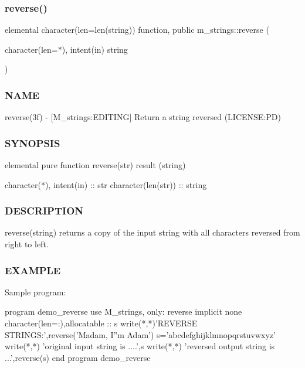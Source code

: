\subsubsection{\texorpdfstring{reverse()}{reverse()}}
{\footnotesize\ttfamily elemental character(len=len(string)) function, public m\+\_\+strings\+::reverse (\begin{DoxyParamCaption}\item[{character(len=$\ast$), intent(in)}]{string }\end{DoxyParamCaption})}



\subsubsection*{N\+A\+ME}

reverse(3f) -\/ \mbox{[}M\+\_\+strings\+:E\+D\+I\+T\+I\+NG\mbox{]} Return a string reversed (L\+I\+C\+E\+N\+SE\+:PD) 

\subsubsection*{S\+Y\+N\+O\+P\+S\+IS}

\begin{DoxyVerb}elemental pure function reverse(str) result (string)

 character(*), intent(in) :: str
 character(len(str))      :: string
\end{DoxyVerb}
 \subsubsection*{D\+E\+S\+C\+R\+I\+P\+T\+I\+ON}

reverse(string) returns a copy of the input string with all characters reversed from right to left.

\subsubsection*{E\+X\+A\+M\+P\+LE}

Sample program\+: \begin{DoxyVerb} program demo_reverse
 use M_strings, only: reverse
 implicit none
 character(len=:),allocatable  :: s
    write(*,*)'REVERSE STRINGS:',reverse('Madam, I''m Adam')
    s='abcdefghijklmnopqrstuvwxyz'
    write(*,*) 'original input string is ....',s
    write(*,*) 'reversed output string is ...',reverse(s)
 end program demo_reverse
\end{DoxyVerb}


